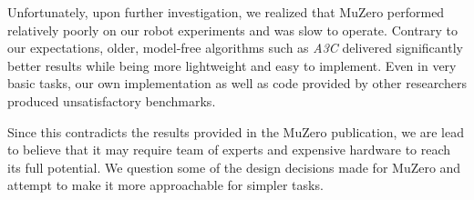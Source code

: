 Unfortunately, upon further investigation, we realized that MuZero performed relatively poorly on our robot experiments and was slow to operate. Contrary to our expectations, older, model-free algorithms such as \textit{A3C} \cite{a3c} delivered significantly better results while being more lightweight and easy to implement. Even in very basic tasks, our own implementation as well as code provided by other researchers produced unsatisfactory benchmarks.

Since this contradicts the results provided in the MuZero publication, we are lead to believe that it may require team of experts and expensive hardware to reach its full potential. We question some of the design decisions made for MuZero and attempt to make it more approachable for simpler tasks.